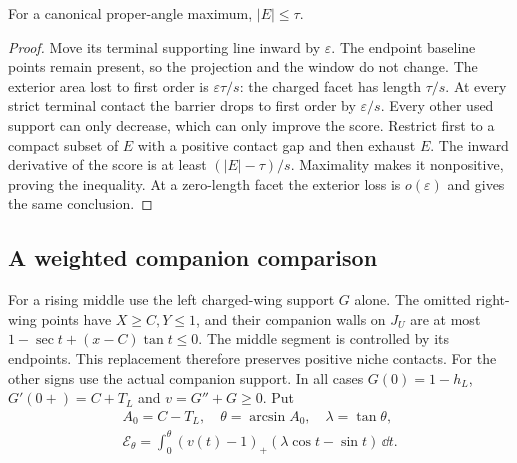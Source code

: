 \begin{lemma}\label{lem:partial-exposure}
For a canonical proper-angle maximum, $|E|\le\tau$.
\end{lemma}
\begin{proof}
Move its terminal supporting line inward by $\varepsilon$.
The endpoint baseline points remain present, so the projection and
the window do not change. The exterior area lost to first order is
$\varepsilon\tau/s$: the charged facet has length $\tau/s$.
At every strict terminal contact the barrier drops to first order
by $\varepsilon/s$. Every other used support can only decrease,
which can only improve the score. Restrict first to a compact subset
of $E$ with a positive contact gap and then exhaust $E$.
The inward derivative of the score is at least
$(|E|-\tau)/s$. Maximality makes it nonpositive, proving the
inequality. At a zero-length facet the exterior loss is
$o(\varepsilon)$ and gives the same conclusion.
\end{proof}

\subsection{A weighted companion comparison}

For a rising middle use the left charged-wing support $G$ alone.
The omitted right-wing points have $X\ge C,Y\le1$, and their
companion walls on $J_U$ are at most
$1-\sec t+(x-C)\tan t\le0$. The middle segment is controlled
by its endpoints. This replacement therefore preserves positive
niche contacts. For the other signs use the actual companion
support. In all cases
$G(0)=1-h_L$, $G'(0+)=C+T_L$ and $v=G''+G\ge0$.
Put
\begin{equation}\label{eq:partial-weighted-error}
 \begin{gathered}
 A_0=C-T_L,\quad\theta=\arcsin A_0,\quad\lambda=\tan\theta,\\
 \mathcal E_\theta=\int_0^\theta(v(t)-1)_+
                 (\lambda\cos t-\sin t)\,\dd t.
 \end{gathered}
\end{equation}

